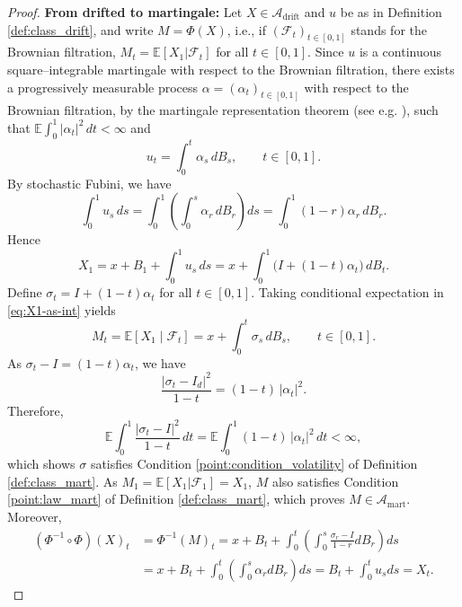 \documentclass[reqno, a4paper]{amsart}
\theoremstyle{plain}
\theoremstyle{definition}
\theoremstyle{remark}
\numberwithin{equation}{section}
\numberwithin{theorem}{section}
\newcommand{\E}{\mathbb{E}}
\begin{document}
	\begin{proof}
		\textbf{From drifted to martingale:} Let $X\in\mathcal A_{\mathrm{drift}}$ and $u$ be as in Definition \ref{def:class_drift}, and write $M = \Phi(X)$, i.e., if $(\mathcal{F}_t)_{t \in [0,1]}$ stands for the Brownian filtration, $M_t = \E[X_1|\mathcal{F}_t]$ for all $t \in [0,1]$.	Since $u$ is a continuous square--integrable martingale with respect to the Brownian filtration, there exists a progressively measurable process $\alpha=(\alpha_t)_{t\in[0,1]}$ with respect to the Brownian filtration, by the martingale representation theorem (see e.g. \cite[Theorem 4.33]{Okse03}),  such that
		$
		\E\!\int_0^1 |\alpha_t|^2\,dt < \infty
		$ 
		and   
		\begin{equation}\label{eq:u-rep}
			u_t = \int_0^t \alpha_s\,dB_s,
			\qquad t\in[0,1].
		\end{equation}
		By stochastic Fubini, we have
		\[
		\int_0^1 u_s\,ds
		=
		\int_0^1\!\left(\int_0^s \alpha_r\,dB_r\right)\!ds
		=
		\int_0^1 (1-r)\alpha_r\,dB_r.
		\]
		Hence
		\begin{equation}\label{eq:X1-as-int}
			X_1
			=
			x+ B_1+\int_0^1 u_s\,ds
			=
			x+ \int_0^1 \Big(I+(1-t)\alpha_t\Big)\,dB_t.
		\end{equation}
		Define $\sigma_t = I+(1-t)\alpha_t$ for all $t \in [0,1]$.
		Taking conditional expectation in \eqref{eq:X1-as-int} yields
		\[
		M_t=\E[X_1\mid \mathcal{F}_t]
		=
		x+ \int_0^t \sigma_s\,dB_s,\qquad t\in[0,1].
		\]
		As $
		\sigma_t-I = (1-t)\alpha_t$, we have
		\begin{equation}\label{eq:alpha_and_sigma}
			\frac{|\sigma_t-I_d|^2}{1-t}
			=
			(1-t)\,|\alpha_t|^2.
		\end{equation}
		Therefore,
		\begin{equation*}
			\E\!\int_0^1 \frac{|\sigma_t-I|^2}{1-t}\,dt
			=
			\E\!\int_0^1 (1-t)\,|\alpha_t|^2\,dt
			<\infty,
		\end{equation*}
		which shows $\sigma$ satisfies Condition \eqref{point:condition_volatility} of Definition \ref{def:class_mart}. As $M_1 = \E[X_1|\mathcal{F}_1] = X_1$, $M$ also satisfies Condition \eqref{point:law_mart} of Definition \ref{def:class_mart}, which proves $M \in \mathcal A_{\textrm{mart}}$. Moreover, 
		\begin{align*}
			(\Phi^{-1} \circ \Phi)(X)_t &= \Phi^{-1}(M)_t = x+ B_t + \int_0^t \left(\int_0^s \frac{\sigma_r-I}{1-r} d B_r \right) ds \\
			&= x+ B_t + \int_0^t \left(\int_0^s \alpha_r d B_r \right) ds =B_t + \int_0^t u_s ds = X_t.

\end{align*}
\end{proof}
\end{document}
